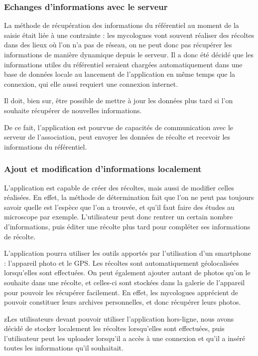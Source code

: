 \documentclass[11pt, a4paper, twoside]{report}
\begin{document}
\subsubsection{Echanges d'informations avec le serveur}

La méthode de récupération des informations du référentiel au moment de la saisie était liée à une contrainte : les mycologues vont souvent réaliser des récoltes dans des lieux où l'on n'a pas de réseau, on ne peut donc pas récupérer les informations de manière dynamique depuis le serveur. Il a donc été décidé que les informations utiles du référentiel seraient chargées automatiquement dans une base de données locale au lancement de l'application en même temps que la connexion, qui elle aussi requiert une connexion internet.

Il doit, bien sur, être possible de mettre à jour les données plus tard si l'on souhaite récupérer de nouvelles informations.

De ce fait, l'application est pourvue de capacités de communication avec le serveur de l'association, peut envoyer les données de récolte et recevoir les informations du référentiel.

\subsubsection{Ajout et modification d'informations localement}

L'application est capable de créer des récoltes, mais aussi de modifier celles réalisées. En effet, la méthode de détermination fait que l'on ne peut pas toujours savoir quelle est l'espèce que l'on a trouvée, et qu'il faut faire des études au microscope par exemple. L'utilisateur peut donc rentrer un certain nombre d'informations, puis éditer une récolte plus tard pour compléter ses informations de récolte.

L'application pourra utiliser les outils apportés par l'utilisation d'un smartphone : l'appareil photo et le GPS. 
Les récoltes sont automatiquement géolocalisées lorsqu'elles sont effectuées. On peut également ajouter autant de photos qu'on le souhaite dans une récolte, et celles-ci sont stockées dans la galerie de l'appareil pour pouvoir les récupérer facilement. En effet, les mycologues apprécient de pouvoir constituer leurs archives personnelles, et donc récupérer leurs photos.

zLes utilisateurs devant pouvoir utiliser l'application hors-ligne, nous avons décidé de stocker localement les récoltes lorsqu'elles sont effectuées, puis l'utilisateur peut les uploader lorsqu'il a accès à une connexion et qu'il a inséré toutes les informations qu'il souhaitait.
\end{document}
